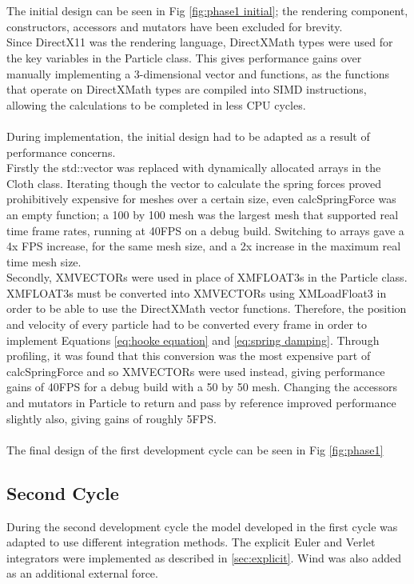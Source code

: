 \\\\The initial design can be seen in Fig \ref{fig:phase1 initial}; the rendering component, constructors, accessors and mutators have been excluded for brevity. 
\\Since DirectX11 was the rendering language, DirectXMath types were used for the key variables in the Particle class. This gives performance gains over manually implementing a 3-dimensional vector and functions, as the functions that operate on DirectXMath types are compiled into SIMD instructions, allowing the calculations to be completed in less CPU cycles.
\\\\During implementation, the initial design had to be adapted as a result of performance concerns. 
\\Firstly the std::vector was replaced with dynamically allocated arrays in the Cloth class. Iterating though the vector to calculate the spring forces proved prohibitively expensive for meshes over a certain size, even calcSpringForce was an empty function; a 100 by 100 mesh was the largest mesh that supported real time frame rates, running at 40FPS on a debug build. Switching to arrays gave a 4x FPS increase, for the same mesh size, and a 2x increase in the maximum real time mesh size.
\\Secondly, XMVECTORs were used in place of XMFLOAT3s in the Particle class. XMFLOAT3s must be converted into XMVECTORs using XMLoadFloat3 in order to be able to use the DirectXMath vector functions. Therefore, the position and velocity of every particle had to be converted every frame in order to implement Equations \ref{eq:hooke equation} and \ref{eq:spring damping}. Through profiling, it was found that this conversion was the most expensive part of calcSpringForce and so XMVECTORs were used instead, giving performance gains of 40FPS for a debug build with a 50 by 50 mesh. Changing the accessors and mutators in Particle to return and pass by reference improved performance slightly also, giving gains of roughly 5FPS.
\\\\The final design of the first development cycle can be seen in Fig \ref{fig:phase1}

\subsection{Second Cycle}
During the second development cycle the model developed in the first cycle was adapted to use different integration methods. The explicit Euler and Verlet integrators were implemented as described in \ref{sec:explicit}. Wind was also added as an additional external force.

